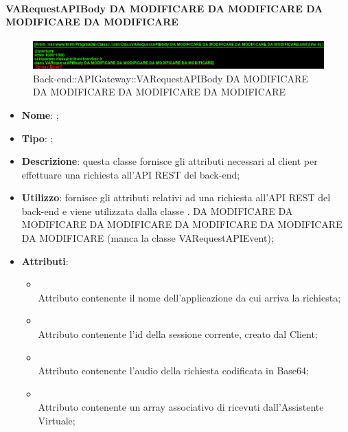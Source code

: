\hypertarget{VARequestAPIBody DA MODIFICARE DA MODIFICARE DA MODIFICARE DA MODIFICARE_label}{\paragraph{VARequestAPIBody DA MODIFICARE DA MODIFICARE DA MODIFICARE DA MODIFICARE}}
\begin{figure}[h]
	\centering
	\includegraphics[width=\textwidth,height=\textheight,keepaspectratio]{images/ClassVARequestAPIBody DA MODIFICARE DA MODIFICARE DA MODIFICARE DA MODIFICARE.png}
	\caption{Back-end::APIGateway::VARequestAPIBody DA MODIFICARE DA MODIFICARE DA MODIFICARE DA MODIFICARE}
\end{figure}
\begin{itemize}
	\item \textbf{Nome}: ;
	\item \textbf{Tipo}: ;
	\item \textbf{Descrizione}: questa classe fornisce gli attributi necessari al client per effettuare una richiesta all'API REST del back-end;
	\item \textbf{Utilizzo}: fornisce gli attributi relativi ad una richiesta all'API REST del back-end e viene utilizzata dalla classe . DA MODIFICARE DA MODIFICARE DA MODIFICARE DA MODIFICARE DA MODIFICARE DA MODIFICARE (manca la classe VARequestAPIEvent);
	\item \textbf{Attributi}:
	\begin{itemize}
		\item[]  \\
		Attributo contenente il nome dell'applicazione da cui arriva la richiesta;
		\item[]  \\
		Attributo contenente l'id della sessione corrente, creato dal Client;
		\item[]  \\
		Attributo contenente l'audio della richiesta codificata in Base64;
		\item[]  \\
		Attributo contenente un array associativo di  ricevuti dall'Assistente Virtuale;
	\end{itemize}
\end{itemize}

